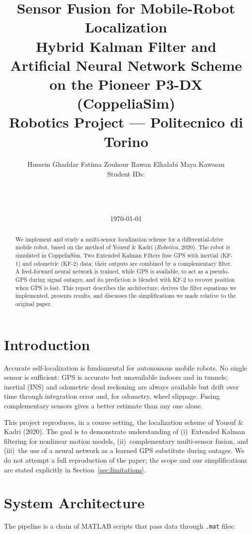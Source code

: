 \documentclass[11pt,a4paper]{article}
\title{\vspace{-1cm}\textbf{\color{polired}Sensor Fusion for Mobile-Robot Localization}\\[4pt]
\large Hybrid Kalman Filter and Artificial Neural Network Scheme\\
on the Pioneer P3-DX (CoppeliaSim)\\[8pt]
\normalsize Robotics Project --- Politecnico di Torino}
\author{Hussein Ghaddar \quad Fatima Zouhour \quad Rawan Elhalabi \quad Maya Kawssan\\[3pt]
\small Student IDs: \rule{2.5cm}{0.4pt} \quad \rule{2.5cm}{0.4pt} \quad \rule{2.5cm}{0.4pt} \quad \rule{2.5cm}{0.4pt}}
\date{\today}
\begin{document}
\maketitle
\thispagestyle{empty}

\begin{abstract}
\noindent We implement and study a multi-sensor localization scheme for a
differential-drive mobile robot, based on the method of Yousuf \& Kadri
(\textit{Robotica}, 2020). The robot is simulated in CoppeliaSim. Two Extended
Kalman Filters fuse GPS with inertial (KF-1) and odometric (KF-2) data; their
outputs are combined by a complementary filter. A feed-forward neural network is
trained, while GPS is available, to act as a pseudo-GPS during signal outages, and
its prediction is blended with KF-2 to recover position when GPS is lost. This
report describes the architecture, derives the filter equations we implemented,
presents results, and discusses the simplifications we made relative to the original
paper.
\end{abstract}

\tableofcontents
\vspace{4mm}

\section{Introduction}
Accurate self-localization is fundamental for autonomous mobile robots. No single
sensor is sufficient: GPS is accurate but unavailable indoors and in tunnels; inertial
(INS) and odometric dead reckoning are always available but drift over time through
integration error and, for odometry, wheel slippage. Fusing complementary sensors
gives a better estimate than any one alone.

This project reproduces, in a course setting, the localization scheme of Yousuf \&
Kadri (2020). The goal is to demonstrate understanding of (i)~Extended Kalman
filtering for nonlinear motion models, (ii)~complementary multi-sensor fusion, and
(iii)~the use of a neural network as a learned GPS substitute during outages. We do
not attempt a full reproduction of the paper; the scope and our simplifications are
stated explicitly in Section~\ref{sec:limitations}.

\section{System Architecture}
The pipeline is a chain of MATLAB scripts that pass data through \texttt{.mat} files:
\end{document}
